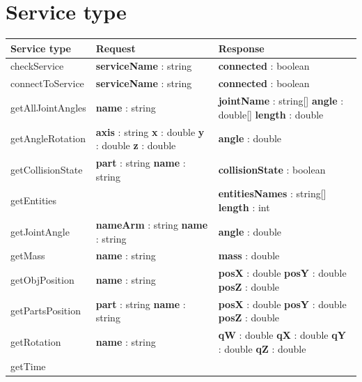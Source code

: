\documentclass[notitlepage]{report}
\begin{document}
\chapter{Service type}
\begin{supertabular}{|p{3cm}|p{4cm}|p{4cm}|}
	\hline
    Service type & Request & Response \\
  	\hline
  	checkService & 
  		\textbf{serviceName} : string 
  		&
  		\textbf{connected} : boolean\\
  	\hline
  	connectToService & 
  		\textbf{serviceName} : string 
  		&
  		\textbf{connected} : boolean\\
  	\hline
  	getAllJointAngles & 
  		\textbf{name} : string 
  		&
  		\textbf{jointName} : string[]\newline
  		\textbf{angle} : double[]\newline
  		\textbf{length} : double\\
  	\hline
  	getAngleRotation & 
  		\textbf{axis} : string \newline
  		\textbf{x} : double\newline
  		\textbf{y} : double\newline
  		\textbf{z} : double
  		&
  		\textbf{angle} : double\\
  	\hline
  	getCollisionState & 
  		\textbf{part} : string \newline
  		\textbf{name} : string
  		&
  		\textbf{collisionState} : boolean\\
  	\hline
  	getEntities & 
  		
  		&
  		\textbf{entitiesNames} : string[]\newline
  		\textbf{length} : int\\
  	\hline
  	getJointAngle & 
  		\textbf{nameArm} : string \newline
  		\textbf{name} : string
  		&
  		\textbf{angle} : double\\
  	\hline
  	getMass & 
  		\textbf{name} : string
  		&
  		\textbf{mass} : double\\
  	\hline
  	getObjPosition & 
  		\textbf{name} : string
  		&
  		\textbf{posX} : double\newline
  		\textbf{posY} : double\newline
  		\textbf{posZ} : double\\
  	\hline
  	getPartsPosition & 
  		\textbf{part} : string\newline
  		\textbf{name} : string
  		&
  		\textbf{posX} : double\newline
  		\textbf{posY} : double\newline
  		\textbf{posZ} : double\\
  	\hline
  	getRotation & 
  		\textbf{name} : string
  		&
  		\textbf{qW} : double\newline
  		\textbf{qX} : double\newline
  		\textbf{qY} : double\newline
  		\textbf{qZ} : double\\
  	\hline
  	getTime & 
  		

\end{supertabular}
\end{document}
